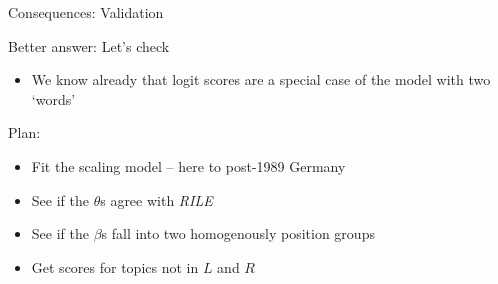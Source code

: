 \documentclass{hertieteaching}
\begin{document}
\begin{frame}{Consequences: Validation}


Better answer: Let's check
\begin{itemize}
  \item We know already that logit scores are a special case of the model with two `words'
\end{itemize}


Plan:
\begin{itemize}
  \item Fit the scaling model -- here to post-1989 Germany
  \item See if the $\theta$s agree with \textit{RILE}
  \item See if the $\beta$s fall into two homogenously position groups
  \item Get scores for topics not in $L$ and $R$
\end{itemize}


\end{frame}
\end{document}
